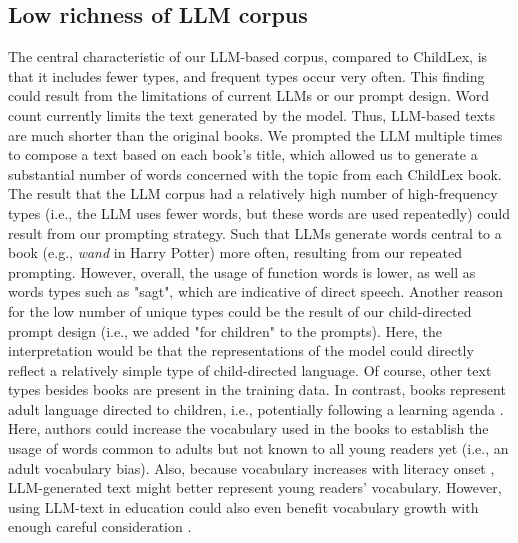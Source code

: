 \documentclass[jou, a4paper]{apa7}
\begin{document}
\subsection*{Low richness of LLM corpus}
The central characteristic of our LLM-based corpus, compared to ChildLex, is that it includes fewer types, and frequent types occur very often. This finding could result from the limitations of current LLMs or our prompt design. Word count currently limits the text generated by the model. Thus, LLM-based texts are much shorter than the original books. We prompted the LLM multiple times to compose a text based on each book's title, which allowed us to generate a substantial number of words concerned with the topic from each ChildLex book. The result that the LLM corpus had a relatively high number of high-frequency types (i.e., the LLM uses fewer words, but these words are used repeatedly) could result from our prompting strategy. Such that LLMs generate words central to a book (e.g., \textit{wand} in Harry Potter) more often, resulting from our repeated prompting. However, overall, the usage of function words is lower, as well as words types such as "sagt", which are indicative of direct speech. Another reason for the low number of unique types could be the result of our child-directed prompt design (i.e., we added "for children" to the prompts). Here, the interpretation would be that the representations of the model could directly reflect a relatively simple type of child-directed language. Of course, other text types besides books are present in the training data. In contrast, books represent adult language directed to children, i.e., potentially following a learning agenda \citep[e.g., ][]{cain_matthew_2011}. Here, authors could increase the vocabulary used in the books to establish the usage of words common to adults but not known to all young readers yet (i.e., an adult vocabulary bias). Also, because vocabulary increases with literacy onset \citep{cunningham_vocabulary_2005}, LLM-generated text might better represent young readers' vocabulary. However, using LLM-text in education could also even benefit vocabulary growth with enough careful consideration \citep[see ][ for a LLM text specific opportunities]{kasneci_chatgpt_2023}. 
\end{document}
